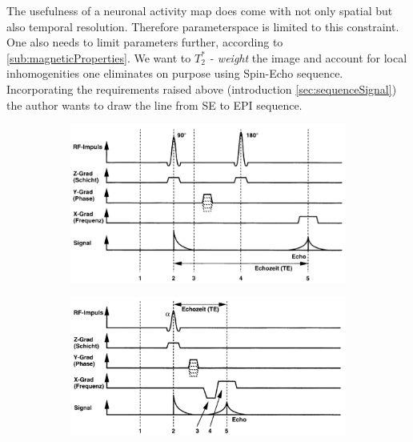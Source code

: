 \documentclass[a4paper]{scrartcl}
\begin{document}
The usefulness of a neuronal activity map does come with not only spatial but also temporal resolution.
Therefore parameterspace is limited to this constraint.
One also needs to limit parameters further, according to \autoref{sub:magneticProperties}. 
We want to \textit{$T_2^*$ - weight} the image and account for local inhomogenities one eliminates on purpose using Spin-Echo sequence.
Incorporating the requirements raised above (introduction \autoref{sec:sequenceSignal}) the author wants to draw the line from SE to EPI sequence.
\begin{figure}[hbt]
  \centering
  \begin{subfigure}[r]{0.45\textwidth}
    \includegraphics[width = .9\textwidth]{pictures/seSeq.png}
    \label{subfig:se}
  \end{subfigure}
  \centering
  \begin{subfigure}[l]{0.45\textwidth}
    \includegraphics[width = .9\textwidth]{pictures/greSeq.png}
    \label{subfig:gre}
  \end{subfigure}
  \centering
  \begin{subfigure}[r]{0.9\textwidth}

\end{subfigure}
\end{figure}
\end{document}
